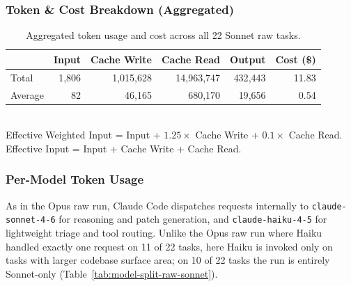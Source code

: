 \subsubsection{Token \& Cost Breakdown (Aggregated)}

\begin{table}[h]
\centering
\small
\caption{Aggregated token usage and cost across all 22 Sonnet raw tasks.}\label{tab:tokens-agg-raw-sonnet}
\setlength{\tabcolsep}{4pt}
\begin{tabular}{lrrrrr}
\toprule
& \textbf{Input} & \textbf{Cache Write} & \textbf{Cache Read} & \textbf{Output} & \textbf{Cost (\$)} \\
\midrule
Total   &  1{,}806 & 1{,}015{,}628 & 14{,}963{,}747 & 432{,}443 & 11.83 \\
Average &       82 &    46{,}165   &    680{,}170   &  19{,}656 &  0.54 \\
\bottomrule
\end{tabular}
\\[4pt]
{\footnotesize
Effective Weighted Input = Input + $1.25 \times$ Cache Write + $0.1 \times$ Cache Read.\quad
Effective Input = Input + Cache Write + Cache Read.}
\end{table}

\subsubsection{Per-Model Token Usage}

As in the Opus raw run, Claude Code dispatches requests internally to
\texttt{claude-sonnet-4-6} for reasoning and patch generation, and
\texttt{claude-haiku-4-5} for lightweight triage and tool routing.
Unlike the Opus raw run where Haiku handled exactly one request on
11 of 22 tasks, here Haiku is invoked only on tasks with larger
codebase surface area; on 10 of 22 tasks the run is entirely
Sonnet-only (Table~\ref{tab:model-split-raw-sonnet}).

